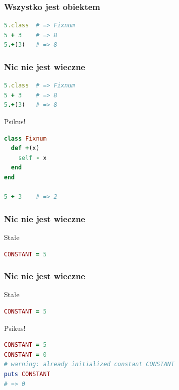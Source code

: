 
\begin{frame}[fragile]
\frametitle{Wszystko jest obiektem}
\begin{block}{}
\begin{lstlisting}[language=Ruby]
5.class  # => Fixnum
5 + 3    # => 8
5.+(3)   # => 8
\end{lstlisting}
\end{block}
\end{frame}

\begin{frame}[fragile]
\frametitle{Nic nie jest wieczne}
\begin{block}{}
\begin{lstlisting}[language=Ruby]
5.class  # => Fixnum
5 + 3    # => 8
5.+(3)   # => 8
\end{lstlisting}
\end{block}
\begin{block}{Psikus!}
\begin{lstlisting}[language=Ruby]
class Fixnum
  def +(x)
    self - x
  end
end

5 + 3    # => 2
\end{lstlisting}
\end{block}
\end{frame}


\begin{frame}[fragile]
\frametitle{Nic nie jest wieczne}
\begin{block}{Stałe}
\begin{lstlisting}[language=Ruby]
CONSTANT = 5
\end{lstlisting}
\end{block}
\end{frame}

\begin{frame}[fragile]
\frametitle{Nic nie jest wieczne}
\begin{block}{Stałe}
\begin{lstlisting}[language=Ruby]
CONSTANT = 5
\end{lstlisting}
\end{block}
\begin{block}{Psikus!}
\begin{lstlisting}[language=Ruby]
CONSTANT = 5
CONSTANT = 0
# warning: already initialized constant CONSTANT
puts CONSTANT
# => 0
\end{lstlisting}
\end{block}
\end{frame}

